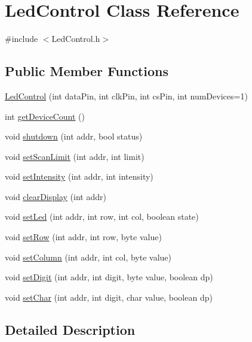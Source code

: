 \hypertarget{class_led_control}{}\section{Led\+Control Class Reference}
\label{class_led_control}


{\ttfamily \#include $<$Led\+Control.\+h$>$}

\subsection*{Public Member Functions}
\begin{DoxyCompactItemize}
\item 
\hyperlink{class_led_control_ab478602bf6a1bd9a6b2bc72d9700794e}{Led\+Control} (int data\+Pin, int clk\+Pin, int cs\+Pin, int num\+Devices=1)
\item 
int \hyperlink{class_led_control_a30139662e87b4a1d693646ac1df97523}{get\+Device\+Count} ()
\item 
void \hyperlink{class_led_control_acae3eb6d78fc9b978fe6968611e48466}{shutdown} (int addr, bool status)
\item 
void \hyperlink{class_led_control_a2d32bbde945924b1389df8cc158c821a}{set\+Scan\+Limit} (int addr, int limit)
\item 
void \hyperlink{class_led_control_a540e6ea4f3d393c1131f4bb7f5b9353d}{set\+Intensity} (int addr, int intensity)
\item 
void \hyperlink{class_led_control_ae162b960d838588bf5cfafc1ba3858bc}{clear\+Display} (int addr)
\item 
void \hyperlink{class_led_control_aca456866199ac52f40e0a6e91c57b443}{set\+Led} (int addr, int row, int col, boolean state)
\item 
void \hyperlink{class_led_control_a471116c0c2d2552dec7c4dda6506d7e7}{set\+Row} (int addr, int row, byte value)
\item 
void \hyperlink{class_led_control_af3cb40a45c736af5a3b3b970510d6b84}{set\+Column} (int addr, int col, byte value)
\item 
void \hyperlink{class_led_control_a3ad4b5566c89e3d03c3a58fb19b4354b}{set\+Digit} (int addr, int digit, byte value, boolean dp)
\item 
void \hyperlink{class_led_control_aae9120ce2427b01ffad4cfaa91e5f537}{set\+Char} (int addr, int digit, char value, boolean dp)
\end{DoxyCompactItemize}


\subsection{Detailed Description}



